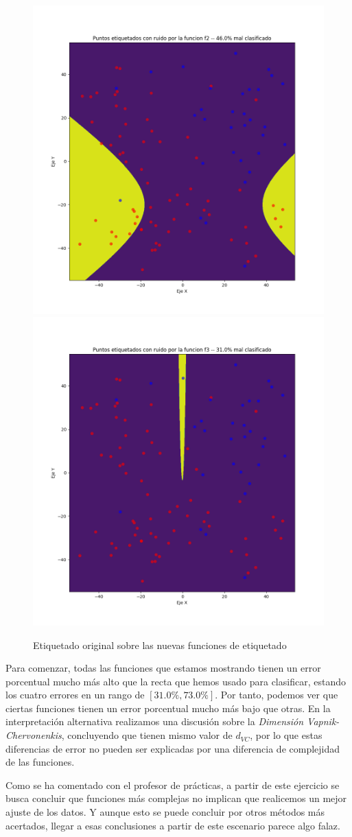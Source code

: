 \documentclass[11pt]{article}
\begin{document}
\begin{figure}[H]
    \includegraphics[width=0.60 \textwidth]{puntos_clasificados_f2.png}
    \includegraphics[width=0.60 \textwidth]{puntos_clasificados_f3.png}

    \caption{Etiquetado original sobre las nuevas funciones de etiquetado}
\end{figure}

Para comenzar, todas las funciones que estamos mostrando tienen un error porcentual mucho más alto que la recta que hemos usado para clasificar, estando los cuatro errores en un rango de $[31.0\%, 73.0\%]$. Por tanto, podemos ver que ciertas funciones tienen un error porcentual mucho más bajo que otras. En la interpretación alternativa realizamos una discusión sobre la \emph{Dimensión Vapnik-Chervonenkis}, concluyendo que tienen mismo valor de $d_{VC}$, por lo que estas diferencias de error no pueden ser explicadas por una diferencia de complejidad de las funciones.

Como se ha comentado con el profesor de prácticas, a partir de este ejercicio se busca concluir que funciones más complejas no implican que realicemos un mejor ajuste de los datos. Y aunque esto se puede concluir por otros métodos más acertados, llegar a esas conclusiones a partir de este escenario parece algo falaz.
\end{document}
